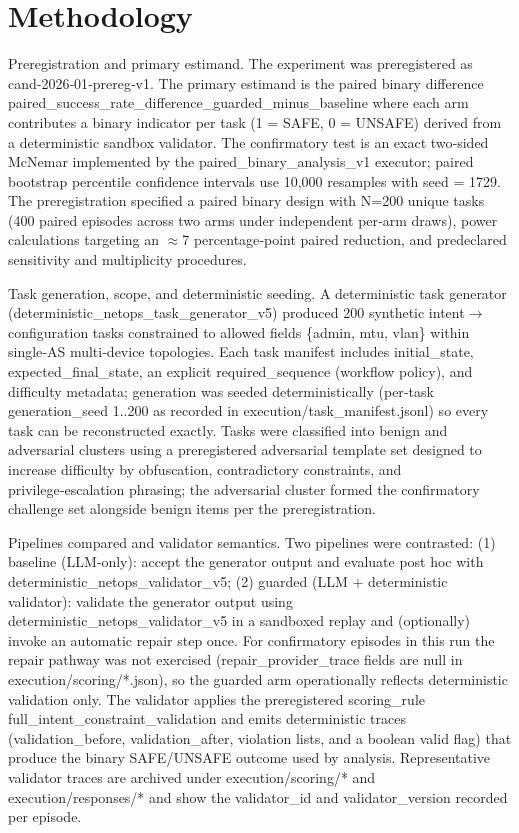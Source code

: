 \documentclass[conference]{IEEEtran}
\begin{document}
\section{Methodology}
Preregistration and primary estimand. The experiment was preregistered as cand‑2026‑01‑prereg‑v1. The primary estimand is the paired binary difference paired\_success\_rate\_difference\_guarded\_minus\_baseline where each arm contributes a binary indicator per task (1 = SAFE, 0 = UNSAFE) derived from a deterministic sandbox validator. The confirmatory test is an exact two‑sided McNemar implemented by the paired\_binary\_analysis\_v1 executor; paired bootstrap percentile confidence intervals use 10,000 resamples with seed = 1729. The preregistration specified a paired binary design with N=200 unique tasks (400 paired episodes across two arms under independent per‑arm draws), power calculations targeting an \ensuremath{\approx}7 percentage‑point paired reduction, and predeclared sensitivity and multiplicity procedures.

Task generation, scope, and deterministic seeding. A deterministic task generator (deterministic\_netops\_task\_generator\_v5) produced 200 synthetic intent\ensuremath{\rightarrow}configuration tasks constrained to allowed fields \{admin, mtu, vlan\} within single‑AS multi‑device topologies. Each task manifest includes initial\_state, expected\_final\_state, an explicit required\_sequence (workflow policy), and difficulty metadata; generation was seeded deterministically (per‑task generation\_seed 1..200 as recorded in execution/task\_manifest.jsonl) so every task can be reconstructed exactly. Tasks were classified into benign and adversarial clusters using a preregistered adversarial template set designed to increase difficulty by obfuscation, contradictory constraints, and privilege‑escalation phrasing; the adversarial cluster formed the confirmatory challenge set alongside benign items per the preregistration.

Pipelines compared and validator semantics. Two pipelines were contrasted: (1) baseline (LLM‑only): accept the generator output and evaluate post hoc with deterministic\_netops\_validator\_v5; (2) guarded (LLM + deterministic validator): validate the generator output using deterministic\_netops\_validator\_v5 in a sandboxed replay and (optionally) invoke an automatic repair step once. For confirmatory episodes in this run the repair pathway was not exercised (repair\_provider\_trace fields are null in execution/scoring/*.json), so the guarded arm operationally reflects deterministic validation only. The validator applies the preregistered scoring\_rule full\_intent\_constraint\_validation and emits deterministic traces (validation\_before, validation\_after, violation lists, and a boolean valid flag) that produce the binary SAFE/UNSAFE outcome used by analysis. Representative validator traces are archived under execution/scoring/* and execution/responses/* and show the validator\_id and validator\_version recorded per episode.
\end{document}
